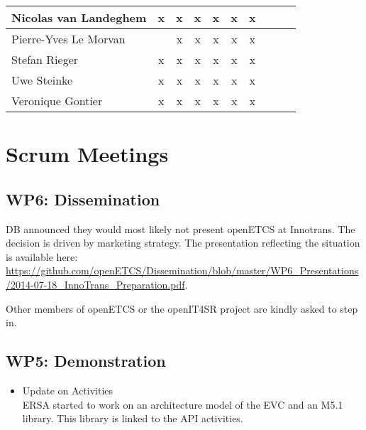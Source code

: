 \documentclass[a4paper, 11pt]{article}
\begin{document}
\begin{tabular}{|l|c|c|c||c|c|c||c|c|c|}
Nicolas van Landeghem& x & x & x & x & x & x \\\hline
Pierre-Yves Le Morvan&   & x & x & x & x & x \\\hline
Stefan Rieger        & x & x & x & x & x & x \\\hline
Uwe Steinke          & x & x & x & x & x & x \\\hline
Veronique Gontier    & x & x & x & x & x & x \\\hline
\end{tabular}


\section{Scrum Meetings}

\subsection{WP6: Dissemination}

DB announced they would most likely not present openETCS at Innotrans. The decision is driven by marketing strategy. The presentation reflecting the situation is available here: \url{https://github.com/openETCS/Dissemination/blob/master/WP6_Presentations/2014-07-18_InnoTrans_Preparation.pdf}. 

Other members of openETCS or the openIT4SR project are kindly asked to step in. 

\subsection{WP5: Demonstration}
\begin{itemize}
\item Update on Activities\\

ERSA started to work on an architecture model of the EVC and an M5.1 library. This library is linked to the API activities.

\end{itemize}
\end{document}
